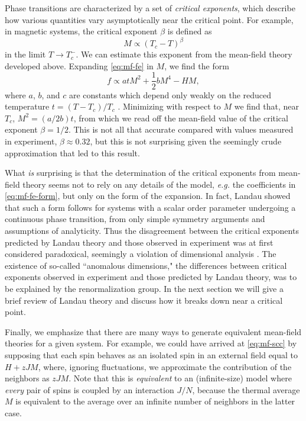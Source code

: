 Phase transitions are characterized by a set of \emph{critical exponents},
which describe how various quantities vary asymptotically near the critical
point. For example, in magnetic systems, the critical exponent $\beta$ is
defined as
\begin{equation}
  M \propto (T_c - T)^{\beta}
\end{equation}
in the limit $T \to T_c^-$.
We can estimate this exponent from the mean-field theory developed above.
Expanding \cref{eq:mf-fe} in $M$, we find the form
\begin{equation}
  f \propto a t M^2 + \frac{1}{2} b M^4 - H M,
  \label{eq:mf-fe-form}
\end{equation}
where $a$, $b$, and $c$ are constants which depend only weakly on the reduced
temperature $t=(T-T_c)/T_c$ \autocite{cardy1996scaling}. Minimizing with
respect to $M$ we find that, near $T_c$, $M^2=(a/2b)t$, from which we read off
the mean-field value of the critical exponent $\beta=1/2$. This is not all that
accurate compared with values measured in experiment, $\beta \approx 0.32$, but
this is not surprising given the seemingly crude approximation that led to this
result.

What \emph{is} surprising is that the determination of the critical exponents
from mean-field theory seems not to rely on any details of the model,
\textit{e.g.} the coefficients in \cref{eq:mf-fe-form}, but only on the form of
the expansion. In fact, Landau showed that such a form follows for systems with
a scalar order parameter undergoing a continuous phase transition, from only
simple symmetry arguments and assumptions of analyticity. Thus the disagreement
between the critical exponents predicted by Landau theory and those observed in
experiment was at first considered paradoxical, seemingly a violation of
dimensional analysis \autocite{goldenfeld1992lectures}. The existence of
so-called ``anomalous dimensions," the differences between critical exponents
observed in experiment and those predicted by Landau theory, was to be
explained by the renormalization group. In the next section we will give a
brief review of Landau theory and discuss how it breaks down near a critical
point.

Finally, we emphasize that there are many ways to generate equivalent
mean-field theories for a given system. For example, we could have arrived at
\cref{eq:mf-scc} by supposing that each spin behaves as an isolated spin in an
external field equal to $H + z J M$, where, ignoring fluctuations, we
approximate the contribution of the neighbors as $z J M$. Note that this is
\emph{equivalent} to an (infinite-size) model where \emph{every} pair of spins
is coupled by an interaction $J/N$, because the thermal average $M$ is
equivalent to the average over an infinite number of neighbors in the latter
case.


